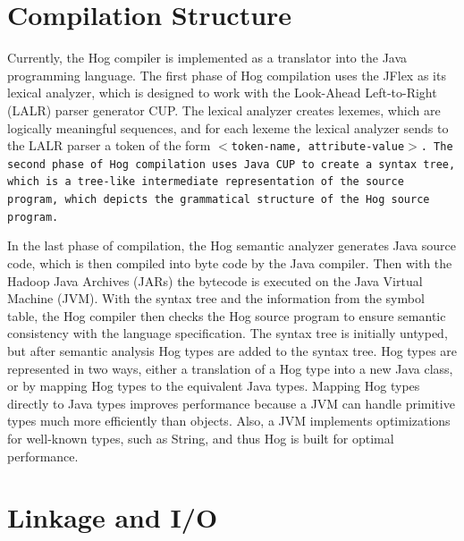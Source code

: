 \documentclass{book}
\begin{document}

\section{Compilation Structure} %
\label{sec:parsing_tools}

Currently, the Hog compiler is implemented as a translator into the Java
programming language. The first phase of Hog compilation uses the JFlex as its
lexical analyzer, which is designed to work with the Look-Ahead Left-to-Right
(LALR) parser generator CUP. The lexical analyzer creates lexemes, which are
logically meaningful sequences, and for each lexeme the lexical analyzer sends
to the LALR parser a token of the form \tt $<$token-name,
attribute-value$>$\rm. The second phase of Hog compilation uses Java CUP to
create a syntax tree, which is a tree-like intermediate representation of the
source program, which depicts the grammatical structure of the Hog source
program.

In the last phase of compilation, the Hog semantic analyzer generates Java source
code, which is then compiled into byte code by the Java compiler. Then with the
Hadoop Java Archives (JARs) the bytecode is executed on the Java Virtual Machine
(JVM). With the syntax tree and the information from the symbol table, the Hog
compiler then checks the Hog source program to ensure semantic consistency with
the language specification. The syntax tree is initially untyped, but after
semantic analysis Hog types are added to the syntax tree. Hog types are
represented in two ways, either a translation of a Hog type into a new Java class,
or by mapping Hog types to the equivalent Java types. Mapping Hog types directly
to Java types improves performance because a JVM can handle primitive types much
more efficiently than objects. Also, a JVM implements optimizations for well-known
types, such as String, and thus Hog is built for optimal performance.


\section{Linkage and I/O} %
\label{sec:linkage_and_i_o}
\end{document}
